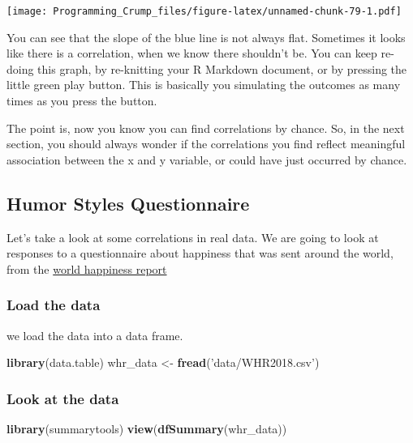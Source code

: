 \documentclass[]{book}
\newenvironment{Shaded}{\begin{snugshade}}{\end{snugshade}}
\newcommand{\KeywordTok}[1]{\textcolor[rgb]{0.13,0.29,0.53}{\textbf{{#1}}}}
\newcommand{\StringTok}[1]{\textcolor[rgb]{0.31,0.60,0.02}{{#1}}}
\newcommand{\NormalTok}[1]{{#1}}
\theoremstyle{definition}
\theoremstyle{definition}
\theoremstyle{definition}
\theoremstyle{remark}
\begin{document}
\texttt{[image: Programming\_Crump\_files/figure-latex/unnamed-chunk-79-1.pdf]}

You can see that the slope of the blue line is not always flat.
Sometimes it looks like there is a correlation, when we know there
shouldn't be. You can keep re-doing this graph, by re-knitting your R
Markdown document, or by pressing the little green play button. This is
basically you simulating the outcomes as many times as you press the
button.

The point is, now you know you can find correlations by chance. So, in
the next section, you should always wonder if the correlations you find
reflect meaningful association between the x and y variable, or could
have just occurred by chance.

\subsection{Humor Styles
Questionnaire}\label{humor-styles-questionnaire}

Let's take a look at some correlations in real data. We are going to
look at responses to a questionnaire about happiness that was sent
around the world, from the \href{http://worldhappiness.report}{world
happiness report}

\subsubsection{Load the data}\label{load-the-data}

we load the data into a data frame.

\begin{Shaded}
\begin{Highlighting}[]
\KeywordTok{library}\NormalTok{(data.table)}
\NormalTok{whr_data <-}\StringTok{ }\KeywordTok{fread}\NormalTok{(}\StringTok{'data/WHR2018.csv'}\NormalTok{)}
\end{Highlighting}
\end{Shaded}

\subsubsection{Look at the data}\label{look-at-the-data-1}

\begin{Shaded}
\begin{Highlighting}[]
\KeywordTok{library}\NormalTok{(summarytools)}
\KeywordTok{view}\NormalTok{(}\KeywordTok{dfSummary}\NormalTok{(whr_data))}
\end{Highlighting}
\end{Shaded}
\end{document}
